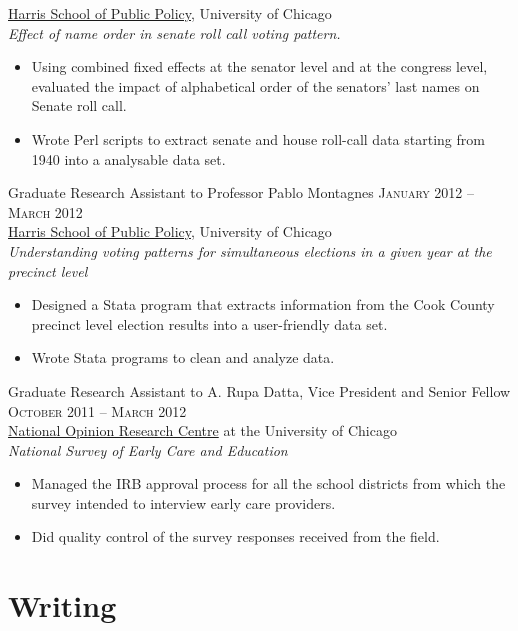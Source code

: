 \documentclass[11pt]{article}
\begin{document}
\href{http://harrisschool.uchicago.edu/directory/faculty/b-pablo_montagnes}{Harris School of Public Policy}, University of Chicago \\ 
\emph{Effect of name order in senate roll call voting pattern.}
\begin{itemize}
\item Using combined fixed effects at the senator level and at the
   congress level, evaluated the impact of alphabetical order of the
   senators' last names on Senate roll call.
\item Wrote Perl scripts to extract senate and house roll-call data starting from 1940 into a analysable data set.
\end{itemize}
\vspace{0.5em}
\pagebreak
Graduate Research Assistant to Professor Pablo Montagnes \hfill
\textsc{January 2012 -- March 2012}\\
\href{http://harrisschool.uchicago.edu/directory/faculty/b-pablo_montagnes}{Harris School of Public Policy}, University of Chicago \\ 
\emph{Understanding voting patterns for simultaneous elections in a given year at the precinct level}
\begin{itemize}
\item Designed a Stata program that extracts information from the Cook
  County precinct level election results into a user-friendly data
  set.
\item Wrote Stata programs to clean and analyze data.
\end{itemize}
\vspace{0.5em}
Graduate Research Assistant to A. Rupa Datta, Vice President and
Senior Fellow  \hfill \textsc{October 2011 -- March 2012}\\
\href{http://www.norc.org/Research/Projects/Pages/national-survey-of-early-care-and-education.aspx}{National Opinion Research Centre} at the University of Chicago \\ 
\emph{National Survey of Early Care and Education}
\begin{itemize}
\item Managed the IRB approval process for all the school districts
  from which the survey intended to interview early care providers.
\item Did quality control of the survey responses received from the field.
\end{itemize}
\section{Writing}
\label{sec-3}
\end{document}
